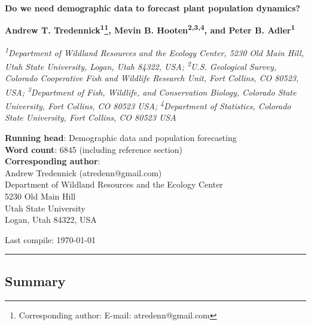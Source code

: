 \documentclass[12pt,]{article}
\title{}
\author{}
\date{}
\let\rmarkdownfootnote\footnote%
\def\footnote{\protect\rmarkdownfootnote}
\begin{document}
\maketitle


\textsf{\LARGE{\textbf{Do we need demographic data to forecast plant population dynamics?}}}

\renewcommand*{\thefootnote}{\fnsymbol{footnote}}

\vspace{1em}

\textsf{\normalsize{\textbf{Andrew T. Tredennick\textsuperscript{1}\footnote{Corresponding author: E-mail: atredenn@gmail.com}, Mevin B. Hooten\textsuperscript{2,3,4}, and Peter B. Adler\textsuperscript{1}}}}

\vspace{1em}

\textsf{\textit{\footnotesize{\textsuperscript{1}Department of Wildland Resources and the Ecology Center, 5230 Old Main Hill, Utah State University, Logan, Utah 84322, USA; \textsuperscript{2}U.S. Geological Survey, Colorado Cooperative Fish and Wildlife Research Unit, Fort Collins, CO 80523, USA; \textsuperscript{3}Department of Fish, Wildlife, and Conservation Biology, Colorado State University, Fort Collins, CO 80523 USA}; \textsuperscript{4}Department of Statistics, Colorado State University, Fort Collins, CO 80523 USA}}

\textbf{Running head}: Demographic data and population forecasting \\
\textbf{Word count}: 6845 (including reference section) \\
\textbf{Corresponding author}: \\
Andrew Tredennick (atredenn@gmail.com) \\
Department of Wildland Resources and the Ecology Center \\
5230 Old Main Hill \\ 
Utah State University \\ 
Logan, Utah 84322, USA


Last compile: \today

\allsectionsfont{\normalfont\sffamily\bfseries}
\renewcommand*{\thefootnote}{\arabic{footnote}} \setcounter{footnote}{0}

\rule{\textwidth}{1pt}

\subsection{Summary}\label{summary}
\end{document}
